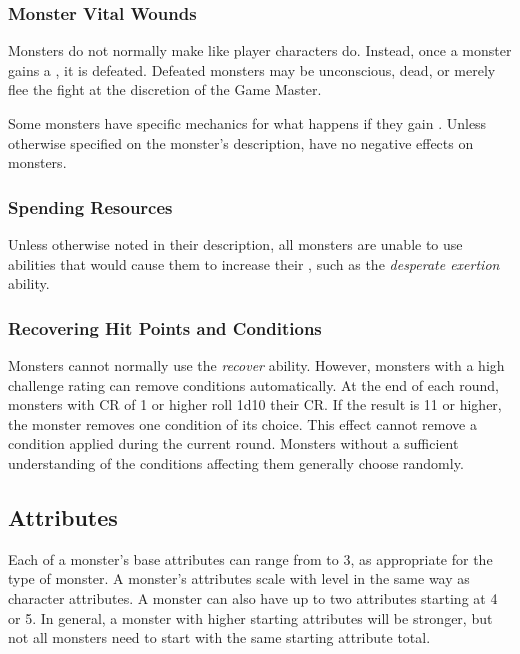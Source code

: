         \subsubsection{Monster Vital Wounds}
            Monsters do not normally make  like player characters do.
            Instead, once a monster gains a , it is defeated.
            Defeated monsters may be unconscious, dead, or merely flee the fight at the discretion of the Game Master.

            Some monsters have specific mechanics for what happens if they gain .
            Unless otherwise specified on the monster's description,  have no negative effects on monsters.

        \subsubsection{Spending Resources}
            Unless otherwise noted in their description, all monsters are unable to use abilities that would cause them to increase their , such as the \textit{desperate exertion} ability.

        \subsubsection{Recovering Hit Points and Conditions}
            Monsters cannot normally use the \textit{recover} ability.
            However, monsters with a high challenge rating can remove conditions automatically.
            At the end of each round, monsters with CR of 1 or higher roll 1d10 \add their CR.
            If the result is 11 or higher, the monster removes one condition of its choice.
            This effect cannot remove a condition applied during the current round.
            Monsters without a sufficient understanding of the conditions affecting them generally choose randomly.

    \subsection{Attributes}
        Each of a monster's base attributes can range from  to 3, as appropriate for the type of monster.
        A monster's attributes scale with level in the same way as character attributes.
        A monster can also have up to two attributes starting at 4 or 5.
        In general, a monster with higher starting attributes will be stronger, but not all monsters need to start with the same starting attribute total.

